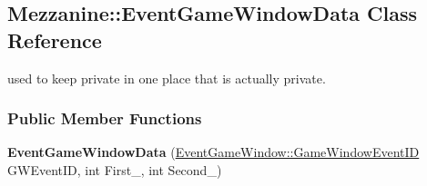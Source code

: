 \hypertarget{classMezzanine_1_1EventGameWindowData}{
\subsection{Mezzanine::EventGameWindowData Class Reference}
\label{classMezzanine_1_1EventGameWindowData}
}


used to keep private in one place that is actually private.  


\subsubsection*{Public Member Functions}
\begin{DoxyCompactItemize}
\item 
\hypertarget{classMezzanine_1_1EventGameWindowData_a19846d2b00c85e87aacc56fd09137e42}{
{\bfseries EventGameWindowData} (\hyperlink{classMezzanine_1_1EventGameWindow_a0f0ff29853317334f018bcf48d502af2}{EventGameWindow::GameWindowEventID} GWEventID, int First\_\-, int Second\_\-)}
\label{classMezzanine_1_1EventGameWindowData_a19846d2b00c85e87aacc56fd09137e42}

\end{DoxyCompactItemize}
